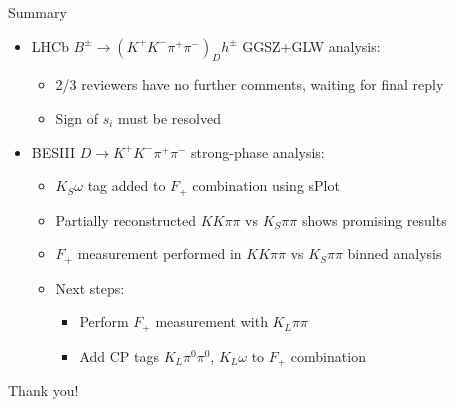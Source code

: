 \documentclass{beamer}
\begin{document}
\begin{frame}{Summary}
  \begin{itemize}
    \setlength\itemsep{1.5em}
    \item{LHCb $B^\pm\to(K^+K^-\pi^+\pi^-)_Dh^\pm$ GGSZ+GLW analysis:}
    \begin{itemize}
      \setlength\itemsep{0.5em}
      \item{2/3 reviewers have no further comments, waiting for final reply}
      \item{Sign of $s_i$ must be resolved}
    \end{itemize}
    \item{BESIII $D\to K^+K^-\pi^+\pi^-$ strong-phase analysis:}
    \begin{itemize}
      \setlength\itemsep{0.5em}
      \item{$K_S\omega$ tag added to $F_+$ combination using sPlot}
      \item{Partially reconstructed $KK\pi\pi$ vs $K_S\pi\pi$ shows promising results}
      \item{$F_+$ measurement performed in $KK\pi\pi$ vs $K_S\pi\pi$ binned analysis}
      \item{Next steps:}
      \begin{itemize}
        \item{Perform $F_+$ measurement with $K_L\pi\pi$}
        \item{Add CP tags $K_L\pi^0\pi^0$, $K_L\omega$ to $F_+$ combination}
      \end{itemize}
    \end{itemize}
  \end{itemize}
  \begin{center}
    \huge Thank you!
  \end{center}
\end{frame}
\end{document}
